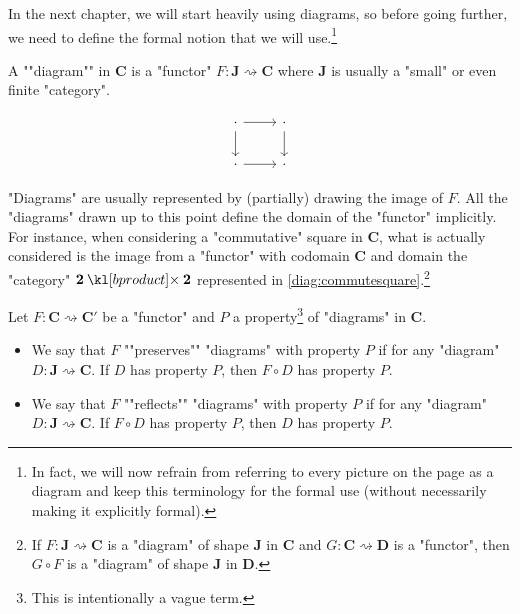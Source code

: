 \documentclass[main.tex]{subfiles}
\begin{document}
In the next chapter, we will start heavily using diagrams, so before going further, we need to define the formal notion that we will use.\footnote{In fact, we will now refrain from referring to every picture on the page as a diagram and keep this terminology for the formal use (without necessarily making it explicitly formal).}%
\begin{defn}[Diagram]\label{defn:diagram}
    \AP A ""diagram"" in $\mathbf{C}$ is a "functor" $F:\mathbf{J}\rightsquigarrow \mathbf{C}$ where $\mathbf{J}$ is usually a "small" or even finite "category".
\end{defn}
\begin{rem}
\begin{marginfigure}
    \begin{equation}\label{diag:commsquare}
        \begin{tikzcd}
            \cdot \arrow[r] \arrow[d] & \cdot \arrow[d] \\
            \cdot \arrow[r] & \cdot
        \end{tikzcd}
    \end{equation}
\end{marginfigure}
"Diagrams" are usually represented by (partially) drawing the image of $F$. All the "diagrams" drawn up to this point define the domain of the "functor" implicitly. For instance, when considering a "commutative" square in $\mathbf{C}$, what is actually considered is the image from a "functor" with codomain $\mathbf{C}$ and domain the "category" $\mathbf{2}\product \mathbf{2}$ represented in \eqref{diag:commutesquare}.\footnote{If $F: \mathbf{J} \rightsquigarrow \mathbf{C}$ is a "diagram" of shape $\mathbf{J}$ in $\mathbf{C}$ and $G: \mathbf{C}\rightsquigarrow \mathbf{D}$ is a "functor", then $G\circ F$ is a "diagram" of shape $\mathbf{J}$ in $\mathbf{D}$.}
\end{rem}
\begin{defn}%
	Let $F: \mathbf{C} \rightsquigarrow \mathbf{C}'$ be a "functor" and $P$ a property\footnote{This is intentionally a vague term.} of "diagrams" in $\mathbf{C}$.
	\begin{itemize}
		\item We say that $F$ ""preserves"" "diagrams" with property $P$ if for any "diagram" $D: \mathbf{J} \rightsquigarrow \mathbf{C}$. If $D$ has property $P$, then $F \circ D$ has property $P$.
		\item We say that $F$ ""reflects"" "diagrams" with property $P$ if for any "diagram" $D: \mathbf{J} \rightsquigarrow \mathbf{C}$. If $F \circ D$ has property $P$, then $D$ has property $P$.
	\end{itemize}
\end{defn}
\end{document}
